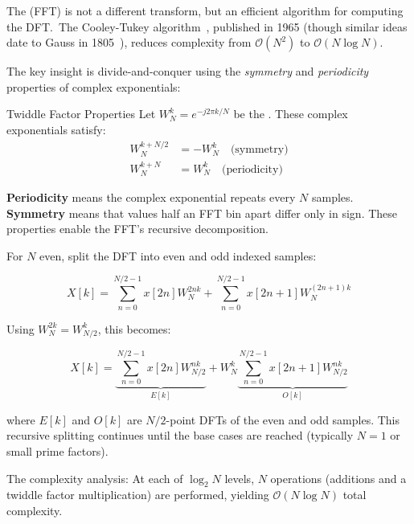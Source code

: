 The  (FFT) is not a different
transform, but an efficient algorithm for computing the DFT.\ The
Cooley-Tukey algorithm~\cite{cooley1965algorithm}, published in 1965
(though similar ideas date to Gauss in
1805~\cite{gauss1866nachlass}), reduces complexity from
$\mathcal{O}(N^2)$ to $\mathcal{O}(N \log N)$.

The key insight is divide-and-conquer using the \emph{symmetry} and
\emph{periodicity} properties of complex exponentials:

\begin{concept}{Twiddle Factor Properties}
  Let $W_N^{k} = e^{-j2\pi k/N}$ be the .
  These complex exponentials satisfy:
  \begin{align}
    \label{eq:twiddle_symmetry}
    W_N^{k+N/2} &= -W_N^{k} \quad \text{(symmetry)} \\
    \label{eq:twiddle_periodicity}
    W_N^{k+N} &= W_N^{k} \quad \text{(periodicity)}
  \end{align}

  \textbf{Periodicity} means the complex exponential repeats every
  $N$ samples. \textbf{Symmetry} means that values half an FFT bin
  apart differ only in sign. These properties enable the FFT's
  recursive decomposition.
\end{concept}

For $N$ even, split the DFT into even and odd indexed samples:

\begin{equation}
  \label{eq:fft_split}
  X[k] = \sum_{n=0}^{N/2-1} x[2n] W_N^{2nk} + \sum_{n=0}^{N/2-1}
  x[2n+1] W_N^{(2n+1)k}
\end{equation}

Using $W_N^{2k} = W_{N/2}^{k}$, this becomes:

\begin{equation}
  \label{eq:fft_butterfly}
  X[k] = \underbrace{\sum_{n=0}^{N/2-1} x[2n] W_{N/2}^{nk}}_{E[k]} +
  W_N^k \underbrace{\sum_{n=0}^{N/2-1} x[2n+1] W_{N/2}^{nk}}_{O[k]}
\end{equation}

where $E[k]$ and $O[k]$ are $N/2$-point DFTs of the even and odd
samples. This recursive splitting continues until the base cases are reached
(typically $N=1$ or small prime factors).

The complexity analysis: At each of $\log_2 N$ levels, $N$ operations
(additions and a twiddle factor multiplication) are performed, yielding
$\mathcal{O}(N \log N)$ total complexity.

